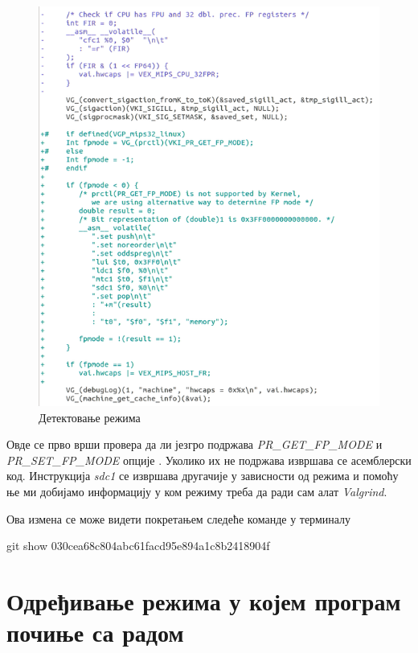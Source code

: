 \documentclass[12pt,oneside]{memoir}
\begin{document}
\begin{figure}[h!]
\begin{center}
\includegraphics[scale=0.75]{slika27.png}
\end{center}
\caption{Детектовање режима}
\label{fig:detekcija}
\end{figure}

\indent Овде се прво врши провера да ли језгро подржава \textit{PR\_GET\_FP\_MODE} и \textit{PR\_SET\_FP\_MODE} опције . Уколико их не подржава извршава се асемблерски код. Инструкција \textit{sdc1} се извршава другачије у зависности од режима и помоћу ње ми добијамо информацију у ком режиму треба да ради сам алат \textit{Valgrind}.

Ова измена се може видети покретањем следеће команде у терминалу

\begin{center}
git show 030cea68c804abc61facd95e894a1c8b2418904f
\end{center}

\section{Одређивање режима у којем програм почиње са радом}
\end{document}
